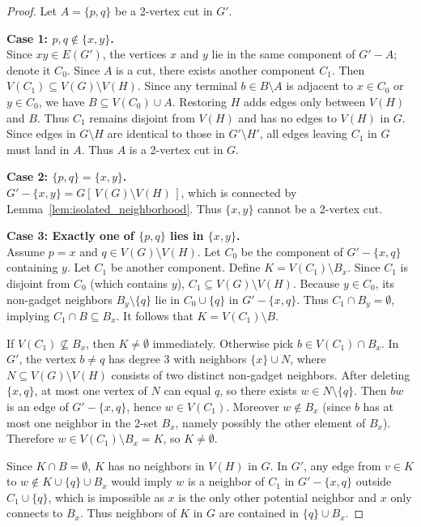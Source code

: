 \documentclass[12pt]{article}
\begin{document}
\begin{proof}
Let $A = \{p, q\}$ be a 2-vertex cut in $G'$.

\medskip
\noindent\textbf{Case 1: $p, q \notin \{x, y\}$.} \\
Since $xy \in E(G')$, the vertices $x$ and $y$ lie in the same component of $G' - A$; denote it $C_0$. Since $A$ is a cut, there exists another component $C_1$.
Then $V(C_1) \subseteq V(G) \setminus V(H)$. Since any terminal $b \in B \setminus A$ is adjacent to $x \in C_0$ or $y \in C_0$, we have $B \subseteq V(C_0) \cup A$.
Restoring $H$ adds edges only between $V(H)$ and $B$. Thus $C_1$ remains disjoint from $V(H)$ and has no edges to $V(H)$ in $G$. Since edges in $G \setminus H$ are identical to those in $G' \setminus H'$, all edges leaving $C_1$ in $G$ must land in $A$. Thus $A$ is a 2-vertex cut in $G$.

\medskip
\noindent\textbf{Case 2: $\{p, q\} = \{x, y\}$.} \\
$G' - \{x, y\} = G[\,V(G) \setminus V(H)\,]$, which is connected by Lemma~\ref{lem:isolated_neighborhood}. Thus $\{x, y\}$ cannot be a 2-vertex cut.

\medskip
\noindent\textbf{Case 3: Exactly one of $\{p, q\}$ lies in $\{x, y\}$.} \\
Assume $p = x$ and $q \in V(G) \setminus V(H)$. Let $C_0$ be the component of $G' - \{x, q\}$ containing $y$. Let $C_1$ be another component.
Define $K = V(C_1) \setminus B_x$. Since $C_1$ is disjoint from $C_0$ (which contains $y$), $C_1 \subseteq V(G) \setminus V(H)$.
Because $y \in C_0$, its non-gadget neighbors $B_y \setminus \{q\}$ lie in $C_0 \cup \{q\}$ in $G' - \{x, q\}$. Thus $C_1 \cap B_y = \emptyset$, implying $C_1 \cap B \subseteq B_x$.
It follows that $K = V(C_1) \setminus B$.

If $V(C_1) \nsubseteq B_x$, then $K \neq \emptyset$ immediately. Otherwise pick $b \in V(C_1) \cap B_x$.
In $G'$, the vertex $b \neq q$ has degree $3$ with neighbors $\{x\} \cup N$, where $N \subseteq V(G)\setminus V(H)$ consists of two distinct non-gadget neighbors.
After deleting $\{x,q\}$, at most one vertex of $N$ can equal $q$, so there exists $w \in N \setminus \{q\}$.
Then $bw$ is an edge of $G' - \{x,q\}$, hence $w \in V(C_1)$. Moreover $w \notin B_x$ (since $b$ has at most one neighbor in the 2-set $B_x$, namely possibly the other element of $B_x$).
Therefore $w \in V(C_1)\setminus B_x = K$, so $K \neq \emptyset$.

Since $K \cap B = \emptyset$, $K$ has no neighbors in $V(H)$ in $G$. In $G'$, any edge from $v \in K$ to $w \notin K \cup \{q\} \cup B_x$ would imply $w$ is a neighbor of $C_1$ in $G' - \{x, q\}$ outside $C_1 \cup \{q\}$, which is impossible as $x$ is the only other potential neighbor and $x$ only connects to $B_x$. Thus neighbors of $K$ in $G$ are contained in $\{q\} \cup B_x$.
\end{proof}
\end{document}
